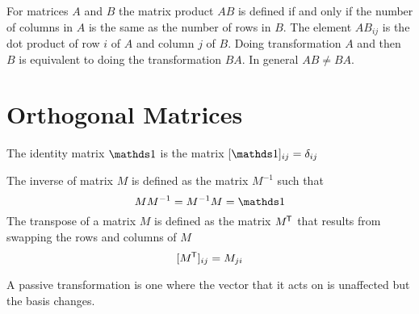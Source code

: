 \documentclass{article}
\begin{document}
    For matrices \(A\) and \(B\) the matrix product \(AB\) is defined if and only if the number of columns in \(A\) is the same as the number of rows in \(B\).
    The element \(AB_{ij}\) is the dot product of row \(i\) of \(A\) and column \(j\) of \(B\).
    Doing transformation \(A\) and then \(B\) is equivalent to doing the transformation \(BA\).
    In general \(AB \ne BA\).
    
    \section{Orthogonal Matrices}
    The identity matrix \(\ident\) is the matrix \([\ident]_{ij} = \delta_{ij}\)
    
    The inverse of matrix \(M\) is defined as the matrix \(M^{-1}\) such that
    \[MM^{-1} = M^{-1}M = \ident\]
    The transpose of a matrix \(M\) is defined as the matrix \(M^{\mkern-1.5mu\mathsf{T}}\) that results from swapping the rows and columns of \(M\)
    \[[M^{\mkern-1.5mu\mathsf{T}}]_{ij} = M_{ji}\]
    
    A passive transformation is one where the vector that it acts on is unaffected but the basis changes.
    
\end{document}
